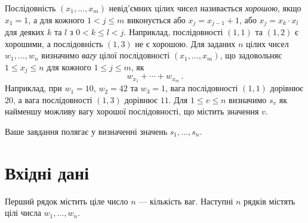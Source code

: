 
\noindent
Послідовність $(x_1,\ldots,x_m)$ невід'ємних цілих чисел називається \emph{хорошою}, якщо $x_1 = 1$, а для кожного $1 < j \leq m$ виконується або $x_j=x_{j-1}+1$, або $x_j=x_k\cdot x_l$ для деяких $k$ та $l$ з $0< k\leq l< j$.
Наприклад, послідовності $(1,1)$ та $(1,2)$ є хорошими, а послідовність $(1,3)$ не є хорошою.
Для заданих $n$ цілих чисел $w_1,\ldots,w_n$ визначимо
\emph{вагу} цілої послідовності $(x_1,\ldots,x_m)$, що задовольняє $1\leq x_j \leq n$ для кожного $1\leq j\leq m$, як
\[ w_{x_1} +\cdots +w_{x_m}\,.\]
Наприклад, при $w_1=10$, $w_2=42$ та $w_3=1$, вага послідовності $(1,1)$ дорівнює $20$, а вага послідовності $(1,3)$ дорівнює $11$.
Для $1\leq v\leq n$ визначимо $s_v$ як найменшу можливу вагу хорошої послідовності, що містить значення $v$.

Ваше завдання полягає у визначенні значень $s_1,\ldots ,s_n$.

\section*{Вхідні дані}

Перший рядок містить ціле число $n$ --- кількість ваг.
Наступні $n$ рядків містять цілі числа $w_1, \ldots, w_n$.

